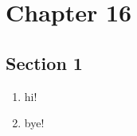 \chapter{Chapter 16}

\section{Section 1}
\begin{enumerate}
    \item hi!
    \item bye!
\end{enumerate}